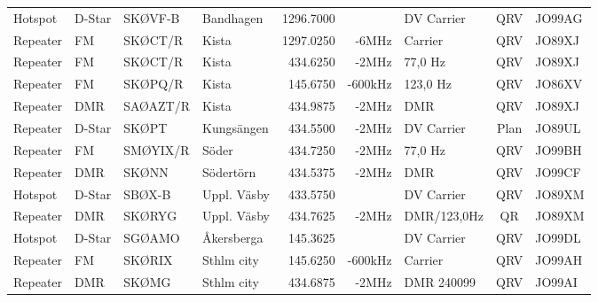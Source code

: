 \begin{landscape}
\begin{longtable}{llllrrlcl}
	Hotspot           & D-Star       & SKØVF-B       & Bandhagen    & 1296.7000         &                & DV Carrier      & QRV             & JO99AG           \\
	Repeater          & FM           & SKØCT/R       & Kista        & 1297.0250         & -6MHz          & Carrier         & QRV             & JO89XJ           \\
	Repeater          & FM           & SKØCT/R       & Kista        & 434.6250          & -2MHz          & 77,0 Hz         & QRV             & JO89XJ           \\
	Repeater          & FM           & SKØPQ/R       & Kista        & 145.6750          & -600kHz        & 123,0 Hz        & QRV             & JO86XV           \\
	Repeater          & DMR          & SAØAZT/R      & Kista        & 434.9875          & -2MHz          & DMR             & QRV             & JO89XJ           \\
	Repeater          & D-Star       & SKØPT         & Kungsängen   & 434.5500          & -2MHz          & DV Carrier      & Plan            & JO89UL           \\
	Repeater          & FM           & SMØYIX/R      & Söder        & 434.7250          & -2MHz          & 77,0 Hz         & QRV             & JO99BH           \\
	Repeater          & DMR          & SKØNN         & Södertörn    & 434.5375          & -2MHz          & DMR             & QRV             & JO99CF           \\
	Hotspot           & D-Star       & SBØX-B        & Uppl. Väsby  & 433.5750          &                & DV Carrier      & QRV             & JO89XM           \\
	Repeater          & DMR          & SKØRYG        & Uppl. Väsby  & 434.7625          & -2MHz          & DMR/123,0Hz     & QR              & JO89XM           \\
	Hotspot           & D-Star       & SGØAMO        & Åkersberga   & 145.3625          &                & DV Carrier      & QRV             & JO99DL           \\
	Repeater          & FM           & SKØRIX        & Sthlm city   & 145.6250          & -600kHz        & Carrier         & QRV             & JO99AH           \\
	Repeater          & DMR          & SKØMG         & Sthlm city   & 434.6875          & -2MHz          & DMR 240099      & QRV             & JO99AI           \\

\end{longtable}
\end{landscape}

